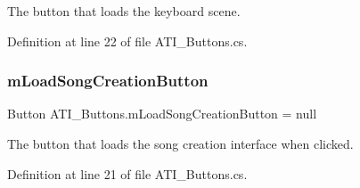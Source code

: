 The button that loads the keyboard scene. 



Definition at line 22 of file A\+T\+I\+\_\+\+Buttons.\+cs.

\mbox{\label{group___a_t_i_buttons_priv_var_ga8ab732143834bd94387cfd94c59886da}} 
\subsubsection{\texorpdfstring{m\+Load\+Song\+Creation\+Button}{mLoadSongCreationButton}}
{\footnotesize\ttfamily Button A\+T\+I\+\_\+\+Buttons.\+m\+Load\+Song\+Creation\+Button = null\hspace{0.3cm}{\ttfamily [private]}}



The button that loads the song creation interface when clicked. 



Definition at line 21 of file A\+T\+I\+\_\+\+Buttons.\+cs.

